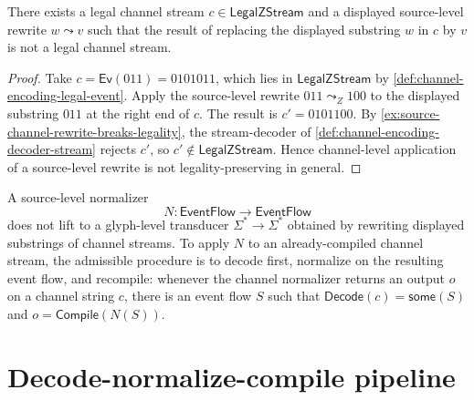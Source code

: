 \begin{proposition}
\label{prop:source-channel-rewrite-may-destroy-legality}
There exists a legal channel stream $c \in \mathsf{LegalZStream}$ and a displayed source-level rewrite $w \leadsto v$ such that the result of replacing the displayed substring $w$ in $c$ by $v$ is not a legal channel stream.
\end{proposition}

\begin{proof}
Take $c = \mathsf{Ev}(011) = 0101011$, which lies in $\mathsf{LegalZStream}$ by \autoref{def:channel-encoding-legal-event}. Apply the source-level rewrite $011 \leadsto_{Z} 100$ to the displayed substring $011$ at the right end of $c$. The result is $c' = 0101100$. By \autoref{ex:source-channel-rewrite-breaks-legality}, the stream-decoder of \autoref{def:channel-encoding-decoder-stream} rejects $c'$, so $c' \notin \mathsf{LegalZStream}$. Hence channel-level application of a source-level rewrite is not legality-preserving in general.
\end{proof}

\begin{corollary}
\label{cor:source-channel-normalizer-not-channel-transducer}
A source-level normalizer
$$
  N \colon \mathsf{EventFlow} \longrightarrow \mathsf{EventFlow}
$$
does not lift to a glyph-level transducer $\Sigma^{*} \to \Sigma^{*}$ obtained by rewriting displayed substrings of channel streams. To apply $N$ to an already-compiled channel stream, the admissible procedure is to decode first, normalize on the resulting event flow, and recompile: whenever the channel normalizer returns an output $o$ on a channel string $c$, there is an event flow $S$ such that $\mathsf{Decode}(c)=\mathsf{some}(S)$ and $o=\mathsf{Compile}(N(S))$.
\end{corollary}

\section{Decode-normalize-compile pipeline}
\label{sec:source-channel-pipeline}

